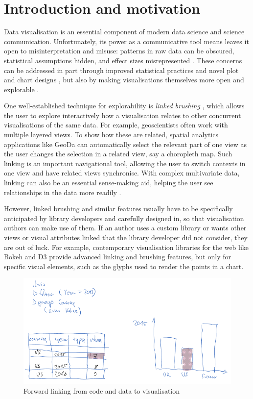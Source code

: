 \section{Introduction and motivation}

Data visualisation is an essential component of modern data science and science
communication. Unfortunately, its power as a communicative tool means leaves it
open to misinterpretation and misuse: patterns in raw data can be obscured,
statistical assumptions hidden, and effect sizes misrepresented
\cite{weissgerber15}. These concerns can be addressed in part through improved
statistical practices and novel plot and chart designs \cite{allen19}, but also
by making visualisations themselves more open and explorable
\cite{dragicevic19}.

One well-established technique for explorability is \emph{linked brushing}
\cite{fisherkeller75,becker87,buja91}, which allows the user to explore
interactively how a visualisation relates to other concurrent visualisations of
the same data. For example, geoscientists often work with multiple layered
views. To show how these are related, spatial analytics applications like GeoDa
\cite{anselin06} can automatically select the relevant part of one view as the
user changes the selection in a related view, say a choropleth map. Such linking
is an important navigational tool, allowing the user to switch contexts in one
view and have related views synchronise. With complex multivariate data, linking
can also be an essential sense-making aid, helping the user see relationships in
the data more readily \cite{he18}.

However, linked brushing and similar features usually have to be specifically
anticipated by library developers and carefully designed in, so that
visualisation authors can make use of them. If an author uses a custom library
or wants other views or visual attributes linked that the library developer did
not consider, they are out of luck. For example, contemporary visualisation
libraries for the web like Bokeh \cite{jolly18} and D3 \cite{bostock11} provide
advanced linking and brushing features, but only for specific visual elements,
such as the glyphs used to render the points in a chart.

\begin{figure}[h]
\includegraphics[scale=0.35]{image/chart-fwd}
\caption{Forward linking from code and data to visualisation}
\end{figure}

